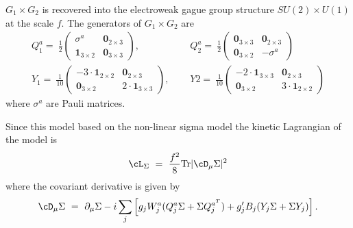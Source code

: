   $G_1 \times G_2$ is recovered into the electroweak gague group structure $SU(2) \times U(1)$ at the scale $f$. 
  The generators of $G_1 \times G_2$ are 
\begin{align}
  Q_1^a =~ \frac{1}{2}\left( \begin{array}{cc}
  \sigma^a  &  {\mathbf{0}}_{2 \times 3} \\
  {\mathbf{1}}_{3 \times 2} &  {\mathbf{0}}_{3 \times 3} 
  \end{array}\right), ~~~~&
   Q_2^a =~ \frac{1}{2}\left( \begin{array}{cc}
  {\mathbf{0}}_{3 \times 3} & {\mathbf{0}}_{2 \times 3} \\
  {\mathbf{0}}_{3 \times 2} & - \sigma^a
  \end{array}\right) \\
  Y_1 =~ \frac{1}{10}\left( \begin{array}{cc}
  -3 \cdot {\mathbf{1}}_{2\times 2}  &  {\mathbf{0}}_{2 \times 3} \\
  {\mathbf{0}}_{3 \times 2} &  2\cdot {\mathbf{1}}_{3 \times 3} 
  \end{array} \right), ~~~~~~&
  Y2 =~ \frac{1}{10}\left( \begin{array}{cc}
  -2 \cdot {\mathbf{1}}_{3\times 3}  &  {\mathbf{0}}_{2 \times 3} \\
  {\mathbf{0}}_{3 \times 2} &  3\cdot {\mathbf{1}}_{2 \times 2} 
  \end{array} \right)
\end{align}
 where $\sigma^a$ are Pauli matrices.
 
  Since this model based on the non-linear sigma model 
   the kinetic Lagrangian of the model is 
  \begin{equation}
   \cL_{\Sigma}~=~\frac{f^2}{8} {\rm{Tr}}|\cD_\mu \Sigma|^2
  \end{equation}
 where the covariant derivative is given by
  \begin{equation}
   \cD_\mu \Sigma ~=~ \partial_\mu \Sigma - i \sum_j \left[ g_j W_j^a(Q_j^a \Sigma + \Sigma Q_j^{a^T}) + g_j'B_j(Y_j\Sigma + \Sigma Y_j) \right] .
  \end{equation}
  
